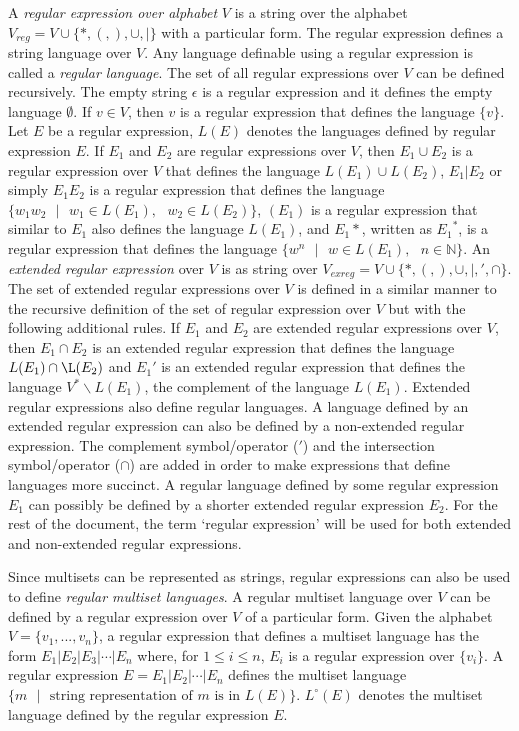 \documentclass[a4paper]{article}
\theoremstyle{definition}
\newcommand{\ts}{\text{ }}
\begin{document}
A \emph{regular expression over alphabet} $V$ is a string over the alphabet $V_{reg} = V \cup 
\{*,(,),\cup,|\}$ with a particular form. The regular expression defines a string language over $V$.
Any language definable using a regular expression is called a \emph{regular language}. The set of 
all regular expressions over $V$ can be defined recursively. The empty string $\epsilon$ is a 
regular expression and it defines the empty language $\emptyset$. If $v \in V$, then $v$ is a
regular expression that defines the language $\{v\}$. Let $E$ be a regular expression, $L(E)$ 
denotes the languages defined by regular expression $E$. If $E_1$ and $E_2$ are regular expressions
over $V$, then $E_1 \cup E_2$ is a regular expression over $V$ that defines the language
$L(E_1) \cup L(E_2)$, $E_1 | E_2$ or simply $E_1 E_2$ is a regular expression that defines the
language $\{w_1 w_2\ts|\ts w_1\in L(E_1),\ts w_2\in L(E_2)\}$, $(E_1)$ is a regular expression that
similar to $E_1$ also defines the language $L(E_1)$, and ${E_1}*$, written as ${E_1}^*$, is a 
regular expression that defines the language $\{w^n\ts |\ts w\in L(E_1),\ts n\in \mathbb{N}\}$. An 
\emph{extended regular expression} over $V$ is as string over $V_{exreg} = V \cup \{*,(,),\cup,|,',
\cap\}$. The set of extended regular expressions over $V$ is defined in a similar manner to the
recursive definition of the set of regular expression over $V$ but with the following additional
rules. If $E_1$ and $E_2$ are extended regular expressions over $V$, then $E_1 \cap E_2$ is an
extended regular expression that defines the language $L(E_1) \cap \L(E_2)$ and $E_1'$ is an
extended regular expression that defines the language $V^*\backslash L(E_1)$, the complement of the
language $L(E_1)$. Extended regular expressions also define regular languages. A language defined by
an extended regular expression can also be defined by a non-extended regular expression.  The 
complement symbol/operator ($'$) and the intersection symbol/operator ($\cap$) are added in order to 
make expressions that define languages more succinct. A regular language defined by some regular
expression $E_1$ can possibly be defined by a shorter extended regular expression $E_2$. For the
rest of the document, the term `regular expression' will be used for both extended and non-extended
regular expressions.

Since multisets can be represented as strings, regular expressions can also be used to define 
\emph{regular multiset languages}. A regular multiset language over $V$ can be defined by a regular
expression over $V$ of a particular form. Given the alphabet $V = \{v_1,...,v_n\}$, a regular 
expression that defines a multiset language has the form $E_1|E_2|E_3|\cdots|E_n$ where, for $1 \leq
i \leq n$, $E_i$ is a regular expression over $\{v_i\}$. A regular expression $E=E_1|E_2|\cdots|E_n$
defines the multiset language $\{m\ts|\ts \text{string representation of $m$ is in $L(E)$}\}$. 
$L^{\circ}(E)$ denotes the multiset language defined by the regular expression $E$.
\end{document}
